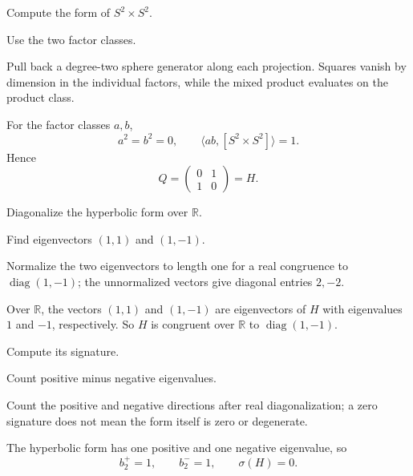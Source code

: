\begin{exercise}\label{exr:viii34-04}
Compute the form of $S^2\times S^2$.
\end{exercise}
\begin{hint}
Use the two factor classes.

Pull back a degree-two sphere generator along each projection. Squares vanish by dimension in the individual factors, while the mixed product evaluates on the product class.
\end{hint}
\begin{solution}
For the factor classes \(a,b\),
\[
a^2=b^2=0,\qquad \langle a b,[S^2\times S^2]\rangle=1.
\]
Hence
\[
Q=\begin{pmatrix}0&1\\1&0\end{pmatrix}=H.
\]
\end{solution}

\begin{exercise}\label{exr:viii34-05}
Diagonalize the hyperbolic form over $\mathbb R$.
\end{exercise}
\begin{hint}
Find eigenvectors $(1,1)$ and $(1,-1)$.

Normalize the two eigenvectors to length one for a real congruence to \(\operatorname{diag}(1,-1)\); the unnormalized vectors give diagonal entries \(2,-2\).
\end{hint}
\begin{solution}
Over \(\mathbb R\), the vectors \((1,1)\) and \((1,-1)\) are eigenvectors of \(H\) with eigenvalues \(1\) and \(-1\), respectively. So \(H\) is congruent over \(\mathbb R\) to \(\operatorname{diag}(1,-1)\).
\end{solution}

\begin{exercise}\label{exr:viii34-06}
Compute its signature.
\end{exercise}
\begin{hint}
Count positive minus negative eigenvalues.

Count the positive and negative directions after real diagonalization; a zero signature does not mean the form itself is zero or degenerate.
\end{hint}
\begin{solution}
The hyperbolic form has one positive and one negative eigenvalue, so
\[
b_2^+=1,\qquad b_2^-=1,\qquad \sigma(H)=0.
\]
\end{solution}

